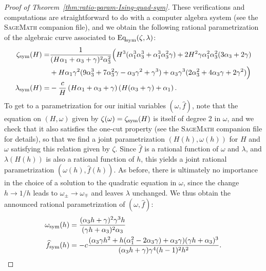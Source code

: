 \documentclass{scrartcl}
\newcommand\wh[1]{\widehat{#1}}
\begin{document}
\begin{proof}[Proof of Theorem~\ref{thm:ratio-param-Ising-quad-sym}]
These verifications and computations are straightforward to do with a computer algebra system (see the \textsc{SageMath} companion file), and we obtain the following rational parametrization of the algebraic curve associated to $\textnormal{Eq}_{\textnormal{sym}}(\zeta,\lambda)$:
\begin{equation}
\begin{aligned}
\zeta_\textnormal{sym}(H) =& \frac{1}{(H\alpha_1 + \alpha_3 + \gamma)^2\alpha_3^2}\Big(H^3(\alpha_1^3\alpha_3^3 + \alpha_1^3\alpha_3^2\gamma)+2H^2\gamma\alpha_1^2\alpha_3^2 (3\alpha_3 + 2\gamma)\\
&+H\alpha_1\gamma^2(9\alpha_3^3+ 7\alpha_3^2\gamma - \alpha_3\gamma^2 + \gamma^3)+\alpha_3\gamma^3(2\alpha_3^2 + 4\alpha_3\gamma + 2\gamma^2)\Big)\\
\lambda_\textnormal{sym}(H) =& -\frac{c}{H}\left(H\alpha_1+\alpha_3+\gamma\right)\left(H(\alpha_3+\gamma)+\alpha_1\right).
\end{aligned}
\label{eq:parametrization-for-Ising-quadrangulations-symmetric-lambda-zeta}
\end{equation}
To get to a parametrization for our initial variables $(\omega,\widehat{f})$, note that the equation on $(H,\omega)$ given by $\zeta(\omega)=\zeta_\textnormal{sym}(H)$ is itself of degree 2 in $\omega$, and we check that it also satisfies the one-cut property (see the \textsc{SageMath} companion file for details), so that we find a joint parametrization $(H(h),\omega(h))$ for $H$ and $\omega$ satisfying this relation given by $\zeta$. Since $\widehat{f}$ is a rational function of $\omega$ and $\lambda$, and $\lambda(H(h))$ is also a rational function of $h$, this yields a joint rational parametrization $(\omega(h),\widehat{f}(h))$. As before, there is ultimately no importance in the choice of a solution to the quadratic equation in $\omega$, since the change $h\to 1/h$ leads to $\omega_{\pm}\to \omega_{\mp}$ and leaves $\lambda$ unchanged. We thus obtain the announced rational parametrization of $(\omega,\wh{f})$:
\begin{equation*}
\begin{aligned}
\omega_\textnormal{sym}(h) &= \frac{(\alpha_3 h +\gamma)^2\gamma^3h}{(\gamma h + \alpha_3)^2\alpha_3}\\
\widehat{f}_\textnormal{sym}(h) &=-c\frac{(\alpha_3 \gamma h^2 + h(\alpha_1^2 - 2\alpha_3\gamma) + \alpha_3 \gamma) (\gamma h +\alpha_3)^3}{(\alpha_3 h + \gamma) \gamma^4 (h - 1)^2h^2}.
\end{aligned}
\end{equation*}
\end{proof}
\end{document}
